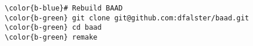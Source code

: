 \documentclass[class=minimal,border=0]{standalone}
\begin{document}
%
\begin{BVerbatim}[bgcolor=b-darkgrey]
\color{b-blue}# Rebuild BAAD
\color{b-green} git clone git@github.com:dfalster/baad.git
\color{b-green} cd baad
\color{b-green} remake
\end{BVerbatim}
\end{document}
